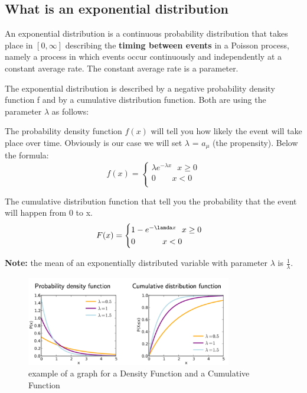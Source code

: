 \subsection{What is an exponential distribution}
An exponential distribution is a continuous probability distribution that takes place in $[0, \infty]$ describing the \textbf{timing between events} in a Poisson process, namely a process in which events occur continuously and independently at a constant average rate. The constant average rate is a parameter.\par

The exponential distribution is described by a negative probability density function f and by a cumulative distribution function. Both are using the parameter $\lambda$ as follows:

The probability density function $f(x)$ will tell you how likely the event will take place over time. Obviously is our case we will set $\lambda$ = $a_\mu$ (the propensity). Below the formula:
\[
f(x) =
\begin{cases}
        \lambda e^{- \lambda x} \ \ \ x \geq 0  \\
        0 \ \ \ \ \ \ \ \ \ x < 0\\
\end{cases}
\]

The cumulative distribution function that tell you the probability that the event will happen from 0 to x.
\[
F(x) =
\begin{cases}
        1 - e^{- \lamda x} \ \ x \geq 0  \\
        0 \ \ \ \ \ \ \ \ \ \ x < 0\\
\end{cases}
\]

\textbf{Note:} the mean of an exponentially distributed variable with parameter $\lambda$ is $\frac{1}{\lambda}$.

\begin{figure}[h]
    \centering
    \includegraphics[width=0.8\textwidth]{Images/06 - Stochastic Simulation of Chemical Reactions/Graphs_Density_Cumulative.png}
    \caption{example of a graph for a Density Function and a Cumulative Function} 
\end{figure}

